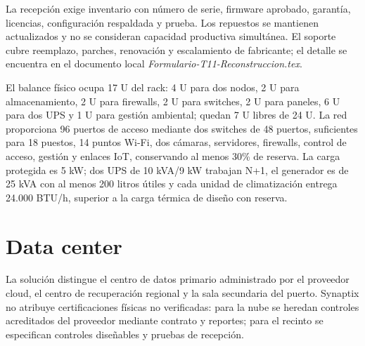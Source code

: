 \documentclass[11pt,letterpaper]{report}
\begin{document}
La recepción exige inventario con número de serie, firmware aprobado, garantía, licencias, configuración respaldada y prueba. Los repuestos se mantienen actualizados y no se consideran capacidad productiva simultánea. El soporte cubre reemplazo, parches, renovación y escalamiento de fabricante; el detalle se encuentra en el documento local \textit{Formulario-T11-Reconstruccion.tex}.

El balance físico ocupa 17 U del rack: 4 U para dos nodos, 2 U para almacenamiento, 2 U para firewalls, 2 U para switches, 2 U para paneles, 6 U para dos UPS y 1 U para gestión ambiental; quedan 7 U libres de 24 U. La red proporciona 96 puertos de acceso mediante dos switches de 48 puertos, suficientes para 18 puestos, 14 puntos Wi-Fi, dos cámaras, servidores, firewalls, control de acceso, gestión y enlaces IoT, conservando al menos 30\% de reserva. La carga protegida es 5 kW; dos UPS de 10 kVA/9 kW trabajan N+1, el generador es de 25 kVA con al menos 200 litros útiles y cada unidad de climatización entrega 24.000 BTU/h, superior a la carga térmica de diseño con reserva.

\section{Data center}

La solución distingue el centro de datos primario administrado por el proveedor cloud, el centro de recuperación regional y la sala secundaria del puerto. Synaptix no atribuye certificaciones físicas no verificadas: para la nube se heredan controles acreditados del proveedor mediante contrato y reportes; para el recinto se especifican controles diseñables y pruebas de recepción.
\end{document}

